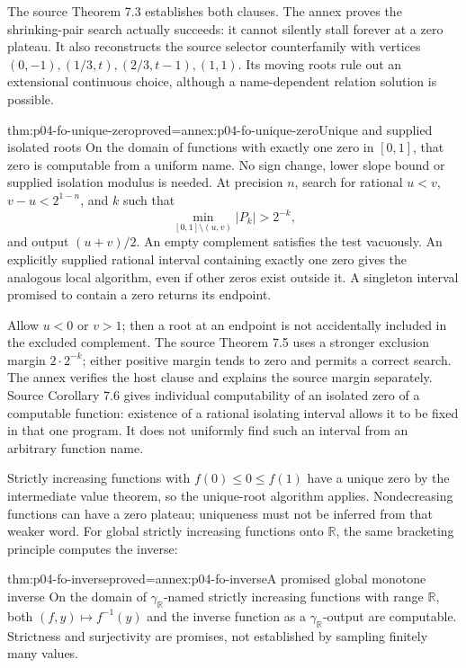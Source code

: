 The source Theorem 7.3 establishes both clauses.
The annex proves the shrinking-pair search actually succeeds:
it cannot silently stall forever at a zero plateau.
It also reconstructs the source selector counterfamily
with vertices \((0,-1),(1/3,t),(2/3,t-1),(1,1)\).
Its moving roots rule out an extensional continuous choice,
although a name-dependent relation solution is possible.

\begin{hbtheorem}{thm:p04-fo-unique-zero}{proved=annex:p04-fo-unique-zero}{Unique and supplied isolated roots}
On the domain of functions with exactly one zero in
\([0,1]\), that zero is computable from a uniform name.
No sign change, lower slope bound or supplied isolation
modulus is needed. At precision \(n\), search for rational
\(u<v\), \(v-u<2^{1-n}\), and \(k\) such that
\[
 \min_{[0,1]\setminus(u,v)}|P_k|>2^{-k},
\]
and output \((u+v)/2\). An empty complement satisfies the
test vacuously.
An explicitly supplied rational interval containing exactly
one zero gives the analogous local algorithm, even if
other zeros exist outside it. A singleton interval promised
to contain a zero returns its endpoint.
\end{hbtheorem}

Allow \(u<0\) or \(v>1\); then a root at an endpoint is
not accidentally included in the excluded complement.
The source Theorem 7.5 uses a stronger exclusion margin
\(2\cdot2^{-k}\); either positive margin tends to zero and
permits a correct search. The annex verifies the host clause
and explains the source margin separately.
Source Corollary 7.6 gives individual computability of an
isolated zero of a computable function: existence of a rational
isolating interval allows it to be fixed in that one program.
It does not uniformly find such an interval from an arbitrary
function name.

Strictly increasing functions with
\(f(0)\leq0\leq f(1)\) have a unique zero by the intermediate
value theorem, so the unique-root algorithm applies.
Nondecreasing functions can have a zero plateau; uniqueness
must not be inferred from that weaker word.
For global strictly increasing functions onto \(\mathbb R\),
the same bracketing principle computes the inverse:

\begin{hbtheorem}{thm:p04-fo-inverse}{proved=annex:p04-fo-inverse}{A promised global monotone inverse}
On the domain of \(\gamma_{\mathbb R}\)-named strictly
increasing functions with range \(\mathbb R\), both
\((f,y)\mapsto f^{-1}(y)\) and the inverse function as a
\(\gamma_{\mathbb R}\)-output are computable.
Strictness and surjectivity are promises, not established
by sampling finitely many values.
\end{hbtheorem}

